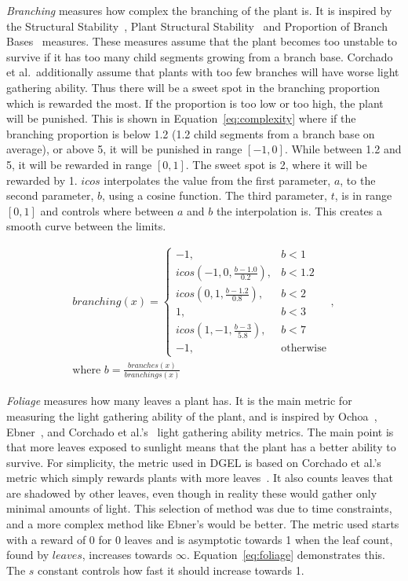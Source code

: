 \textit{Branching} measures how complex the branching of the plant is.
It is inspired by the Structural Stability~\cite{1998Ochoa}, Plant Structural Stability~\cite{2009Corchado} and Proportion of Branch Bases~\cite{1998Ochoa} measures.
These measures assume that the plant becomes too unstable to survive if it has too many \glspl{child segment} growing from a \gls{branch base}.
Corchado et al.\ additionally assume that plants with too few branches will have worse light gathering ability.
Thus there will be a sweet spot in the branching proportion which is rewarded the most.
If the proportion is too low or too high, the plant will be punished.
This is shown in Equation~\ref{eq:complexity} where if the branching proportion is below 1.2 (1.2 \glspl{child segment} from a \gls{branch base} on average), or above 5, it will be punished in range $[-1, 0]$.
While between 1.2 and 5, it will be rewarded in range $[0, 1]$.
The sweet spot is 2, where it will be rewarded by 1.
$icos$ interpolates the value from the first parameter, $a$, to the second parameter, $b$, using a cosine function.
The third parameter, $t$, is in range $[0, 1]$ and controls where between $a$ and $b$ the interpolation is.
This creates a smooth curve between the limits.

\begin{equation}
\label{eq:complexity}
\begin{aligned}
    branching(x) =
    \begin{cases}
        -1, & b < 1 \\
        icos(-1, 0, \frac{b - 1.0}{0.2}), & b < 1.2 \\
        icos(0, 1, \frac{b - 1.2}{0.8}), & b < 2 \\
        1, & b < 3 \\
        icos(1, -1, \frac{b - 3}{5.8}), & b < 7 \\
        -1, & \text{otherwise}
    \end{cases}, \\
    \text{where } b = \frac{branches(x)}{branchings(x)}
\end{aligned}
\end{equation}

\textit{Foliage} measures how many leaves a plant has.
It is the main metric for measuring the light gathering ability of the plant, and is inspired by Ochoa~\cite{1998Ochoa}, Ebner~\cite{2003Ebner}, and Corchado et al.'s~\cite{2009Corchado} light gathering ability metrics.
The main point is that more leaves exposed to sunlight means that the plant has a better ability to survive.
For simplicity, the metric used in \gls{DGEL} is based on Corchado et al.'s metric which simply rewards plants with more leaves~\cite{2009Corchado}.
It also counts leaves that are shadowed by other leaves, even though in reality these would gather only minimal amounts of light.
This selection of method was due to time constraints, and a more complex method like Ebner's would be better.
The metric used starts with a reward of 0 for 0 leaves and is asymptotic towards 1 when the leaf count, found by $leaves$, increases towards $\infty$.
Equation~\ref{eq:foliage} demonstrates this.
The $s$ constant controls how fast it should increase towards 1.

